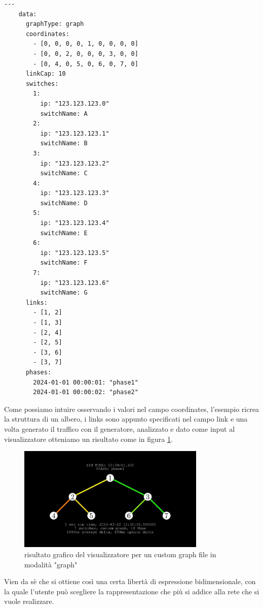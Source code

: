 \documentclass[binding=0.6cm]{sapthesis}
\begin{document}
{\scriptsize %
\begin{lstlisting}[caption={Esempio di custom graph file, graphType posto al valore graph}]
    ---
    data:
      graphType: graph
      coordinates:
        - [0, 0, 0, 0, 1, 0, 0, 0, 0]
        - [0, 0, 2, 0, 0, 0, 3, 0, 0]
        - [0, 4, 0, 5, 0, 6, 0, 7, 0]
      linkCap: 10
      switches:
        1:
          ip: "123.123.123.0"
          switchName: A
        2:
          ip: "123.123.123.1"
          switchName: B
        3:
          ip: "123.123.123.2"
          switchName: C
        4:
          ip: "123.123.123.3"
          switchName: D
        5:
          ip: "123.123.123.4"
          switchName: E
        6:
          ip: "123.123.123.5"
          switchName: F
        7:
          ip: "123.123.123.6"
          switchName: G
      links:
        - [1, 2]
        - [1, 3]
        - [2, 4]
        - [2, 5]
        - [3, 6]
        - [3, 7]
      phases:
        2024-01-01 00:00:01: "phase1"
        2024-01-01 00:00:02: "phase2"
\end{lstlisting}
}

Come possiamo intuire osservando i valori nel campo coordinates, l'esempio ricrea la struttura di un albero, i links sono appunto specificati 
nel campo link e una volta generato il traffico con il generatore, analizzato e dato come input 
al visualizzatore otteniamo un risultato come in figura \ref{fig:tree_custom}.
\newline
\begin{figure}[h]
    \centering
    \includegraphics[width=0.8\textwidth]{immagini/free_graph.JPG}
    \caption{risultato grafico del visualizzatore per un custom graph file in modalità "graph"}
    \label{fig:tree_custom}
\end{figure}
Vien da sè che si ottiene così una certa libertà di espressione bidimensionale, con la quale l'utente può scegliere
la rappresentazione che più si addice alla rete che si vuole realizzare.
\end{document}
